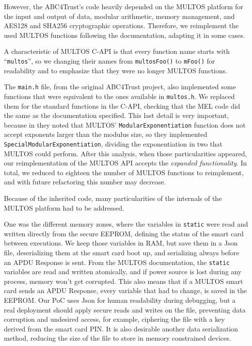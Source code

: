 \documentclass[journal]{IEEEtran}
\begin{document}
However, the ABC4Trust's code heavily depended on the MULTOS platform for the input and output of data, modular arithmetic, memory management, and AES128 and SHA256 cryptographic operations. Therefore, we reimplement the used MULTOS functions following the documentation, adapting it in some cases.

A characteristic of MULTOS C-API is that every function name starts with ``\texttt{multos}'', so we changing their names from \texttt{multosFoo()} to \texttt{mFoo()} for readability and to emphasize that they were no longer MULTOS functions.

The \texttt{main.h} file, from the original ABC4Trust project, also implemented some functions that were equivalent to the ones available in \texttt{multos.h}. We replaced them for the standard functions in the C-API, checking that the MEL code did the same as the documentation specified. This last detail is very important, because in \citep{vullers2013efficient} they noted that MULTOS' \texttt{ModularExponentiation} function does not accept exponents larger than the modulus size, so they implemented \texttt{SpecialModularExponentiation}, dividing the exponentiation in two that MULTOS could perform. After this analysis, when those particularities appeared, our reimplementation of the MULTOS API accepts the \textit{expanded functionality}. In total, we reduced to eighteen the number of MULTOS functions to reimplement, and with future refactoring this number may decrease.

\hfil

Because of the inherited code, many particularities of the internals of the MULTOS platform had to be addressed. 

One was the different memory zones, where the variables in \texttt{static} were read and written directly from the secure EEPROM, defining the status of the smart card between executions. We keep those variables in RAM, but save them in a Json file, deserializing them at the smart card boot up, and serializing always before an APDU Response is sent. From the MULTOS documentation, the \texttt{static} variables are read and written atomically, and if power source is lost during any process, memory won't get corrupted. This also means that if a MULTOS smart card sends an APDU Response, every variable that had to change, is saved in the EEPROM. Our PoC uses Json for human readability during debugging, but a real deployment should apply secure reads and writes on the file, preventing data corruption and undesired access, for example, ciphering the file with a key derived from the smart card PIN. It is also desirable another data serialization method, reducing the size of the file to store in memory constrained devices.
\end{document}
